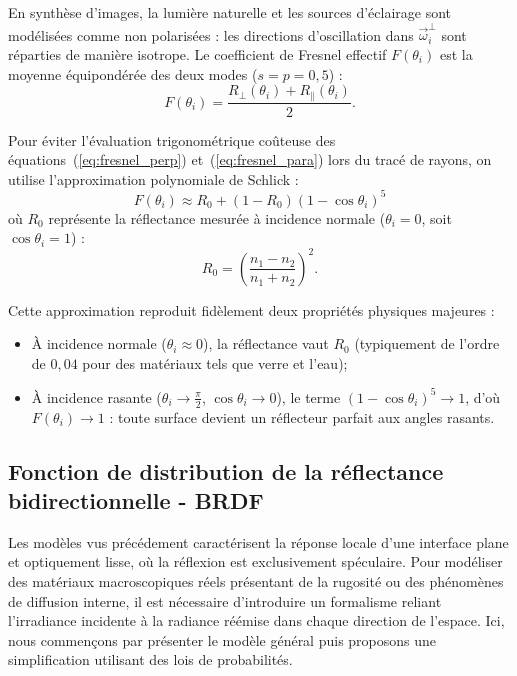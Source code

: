 En synthèse d'images, la lumière naturelle et les sources d'éclairage sont modélisées comme non polarisées : les directions d'oscillation dans $\vec{\omega}_i^\perp$ sont réparties de manière isotrope. Le coefficient de Fresnel effectif $F(\theta_i)$ est la moyenne équipondérée des deux modes ($s = p = 0{,}5$) :
\begin{equation}
    F(\theta_i) = \frac{R_\perp(\theta_i) + R_\parallel(\theta_i)}{2}.
\end{equation}

\begin{proposition}
    Pour éviter l'évaluation trigonométrique coûteuse des équations~(\ref{eq:fresnel_perp}) et~(\ref{eq:fresnel_para}) lors du tracé de rayons, on utilise l'approximation polynomiale de Schlick :
    \begin{equation}
        F(\theta_i) \approx R_0 + (1 - R_0)(1 - \cos\theta_i)^5
    \end{equation}
    où $R_0$ représente la réflectance mesurée à incidence normale ($\theta_i = 0$, soit $\cos\theta_i = 1$) :
    \begin{equation}
        R_0 = \left( \frac{n_1 - n_2}{n_1 + n_2} \right)^2.
    \end{equation}
\end{proposition}

Cette approximation reproduit fidèlement deux propriétés physiques majeures :
\begin{itemize}
    \item À incidence normale ($\theta_i \approx 0$), la réflectance vaut $R_0$ (typiquement de l'ordre de $0{,}04$ pour des matériaux tels que verre et l'eau);
    \item À incidence rasante ($\theta_i \to \frac{\pi}{2}$, $\cos\theta_i \to 0$), le terme $(1 - \cos\theta_i)^5 \to 1$, d'où $F(\theta_i) \to 1$ : toute surface devient un réflecteur parfait aux angles rasants.
\end{itemize}

\subsection{Fonction de distribution de la réflectance bidirectionnelle - BRDF}

Les modèles vus précédement caractérisent la réponse locale d'une interface plane et optiquement lisse, où la réflexion est exclusivement spéculaire. Pour modéliser des matériaux macroscopiques réels présentant de la rugosité ou des phénomènes de diffusion interne, il est nécessaire d'introduire un formalisme reliant l'irradiance incidente à la radiance réémise dans chaque direction de l'espace.
Ici, nous commençons par présenter le modèle général puis proposons une simplification utilisant des lois de probabilités. 

